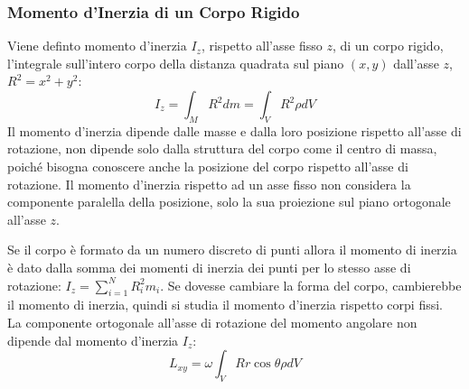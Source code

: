 \documentclass{article}
\numberwithin{equation}{subsection}
\begin{document}
\subsubsection{Momento d'Inerzia di un Corpo Rigido}

Viene definto momento d'inerzia $I_z$, rispetto all'asse fisso $z$, di un corpo rigido, l'integrale sull'intero corpo della distanza quadrata sul piano $(x,y)$ dall'asse $z$, 
$R^2=x^2+y^2$:  
\begin{equation}
    I_z=\displaystyle\int_M R^2dm=\int_V R^2\rho dV
\end{equation}
Il momento d'inerzia dipende dalle masse e dalla loro posizione rispetto all'asse di rotazione, non dipende solo dalla struttura del corpo come il centro di massa, poiché 
bisogna conoscere anche la posizione del corpo rispetto all'asse di rotazione. Il momento d'inerzia rispetto ad un asse fisso non considera la componente paralella della 
posizione, solo la sua proiezione sul piano ortogonale all'asse $z$.  




Se il corpo è formato da un numero discreto di punti allora 
il momento di inerzia è dato dalla somma dei momenti di inerzia dei punti per lo stesso asse di rotazione: $I_z=\displaystyle\sum_{i=1}^{N}R_i^2m_i$. 
Se dovesse cambiare la forma del corpo, cambierebbe 
il momento di inerzia, quindi si studia il momento d'inerzia 
rispetto corpi fissi. 
\\
La componente ortogonale all'asse di rotazione del momento angolare non dipende dal momento d'inerzia $I_z$:
\begin{equation*}
    L_{xy}=\omega\int_V Rr\cos\theta \rho dV
\end{equation*}
\end{document}
